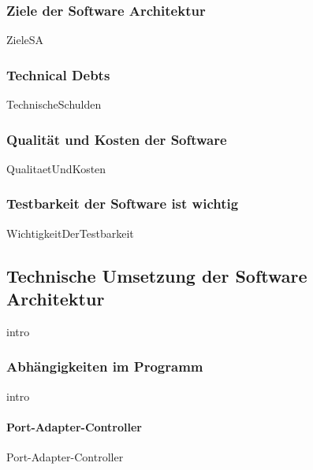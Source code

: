 \documentclass{article}
\begin{document}
        \subsubsection{Ziele der Software Architektur}
            {ZieleSA}
        \subsubsection{Technical Debts}
            {TechnischeSchulden}

    \newpage
        \subsubsection{Qualität und Kosten der Software}
        \nocite{MF_isHighQuilatySoftwareWorthTheCost}
            {QualitaetUndKosten}
        
        \subsubsection{Testbarkeit der Software ist wichtig}
            {WichtigkeitDerTestbarkeit}
   
    \newpage
    \subsection{Technische Umsetzung der Software Architektur}
    \label{kap:commonArchitectureDescription}
        {intro}

        \newpage
        \subsubsection{Abhängigkeiten im Programm}
        \label{kap:Structur}
            {intro}
            \label{kap:StrukturIntro}

            \paragraph{Port-Adapter-Controller}
            \label{Port-Adapter-Controller}
                {Port-Adapter-Controller}
\end{document}
